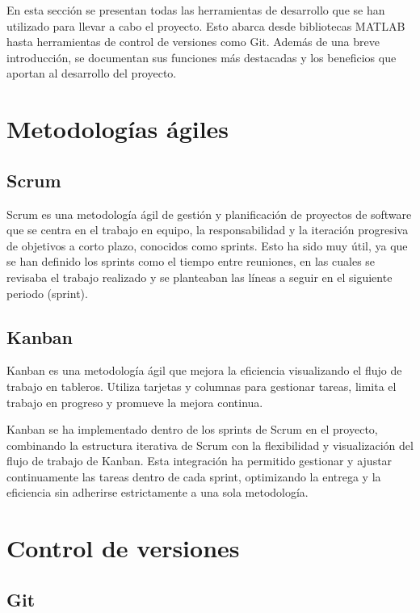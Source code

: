 
En esta sección se presentan todas las herramientas de desarrollo que se han utilizado para llevar a cabo el proyecto. Esto abarca desde bibliotecas MATLAB hasta herramientas de control de versiones como Git. Además de una breve introducción, se documentan sus funciones más destacadas y los beneficios que aportan al desarrollo del proyecto.

\section{Metodologías ágiles}\label{metodologías-ágiles}

\subsection{Scrum}\label{scrum}

Scrum es una metodología ágil de gestión y planificación de proyectos de software que se centra en el trabajo en equipo, la responsabilidad y la iteración progresiva de objetivos a corto plazo, conocidos como sprints. Esto ha sido muy útil, ya que se han definido los sprints como el tiempo entre reuniones, en las cuales se revisaba el trabajo realizado y se planteaban las líneas a seguir en el siguiente periodo (sprint).

\subsection{Kanban}\label{kanban}

Kanban es una metodología ágil que mejora la eficiencia visualizando el flujo de trabajo en tableros. Utiliza tarjetas y columnas para gestionar tareas, limita el trabajo en progreso y promueve la mejora continua.

Kanban se ha implementado dentro de los sprints de Scrum en el proyecto, combinando la estructura iterativa de Scrum con la flexibilidad y visualización del flujo de trabajo de Kanban. Esta integración ha permitido gestionar y ajustar continuamente las tareas dentro de cada sprint, optimizando la entrega y la eficiencia sin adherirse estrictamente a una sola metodología.

\section{Control de versiones}\label{control-de-versiones}

\subsection{Git}\label{git}

